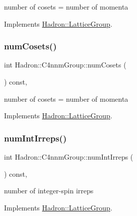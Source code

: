 number of cosets = number of momenta 

Implements \mbox{\hyperlink{structHadron_1_1LatticeGroup_afc76430f36a3a041f86d4058c59bf55e}{Hadron\+::\+Lattice\+Group}}.

\mbox{\label{structHadron_1_1C4nnmGroup_a38cf4c54a4dff0a3c056aa3a1dc4dca2}} 
\subsubsection{\texorpdfstring{numCosets()}{numCosets()}\hspace{0.1cm}{\footnotesize\ttfamily [3/3]}}
{\footnotesize\ttfamily int Hadron\+::\+C4nnm\+Group\+::num\+Cosets (\begin{DoxyParamCaption}{ }\end{DoxyParamCaption}) const\hspace{0.3cm}{\ttfamily [inline]}, {\ttfamily [virtual]}}

number of cosets = number of momenta 

Implements \mbox{\hyperlink{structHadron_1_1LatticeGroup_afc76430f36a3a041f86d4058c59bf55e}{Hadron\+::\+Lattice\+Group}}.

\mbox{\label{structHadron_1_1C4nnmGroup_afc1f011462142b5aa3ddab6e5824d365}} 
\subsubsection{\texorpdfstring{numIntIrreps()}{numIntIrreps()}\hspace{0.1cm}{\footnotesize\ttfamily [1/3]}}
{\footnotesize\ttfamily int Hadron\+::\+C4nnm\+Group\+::num\+Int\+Irreps (\begin{DoxyParamCaption}{ }\end{DoxyParamCaption}) const\hspace{0.3cm}{\ttfamily [inline]}, {\ttfamily [virtual]}}

number of integer-\/spin irreps 

Implements \mbox{\hyperlink{structHadron_1_1LatticeGroup_af2aa7b39222bf188389356eefcef7547}{Hadron\+::\+Lattice\+Group}}.

